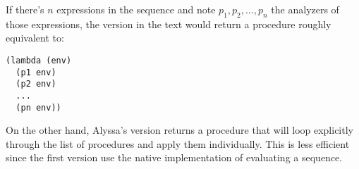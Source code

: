 \documentclass[a4paper,12pt]{article}
\begin{document}
If there's $n$ expressions in the sequence and note $p_1, p_2, \ldots,
p_n$ the analyzers of those expressions, the version in the text would
return a procedure roughly equivalent to:

\begin{lstlisting}
(lambda (env)
  (p1 env)
  (p2 env)
  ...
  (pn env))
\end{lstlisting}

On the other hand, Alyssa's version returns a procedure that will loop
explicitly through the list of procedures and apply them
individually.  This is less efficient since the first version use the
native implementation of evaluating a sequence.
\end{document}
